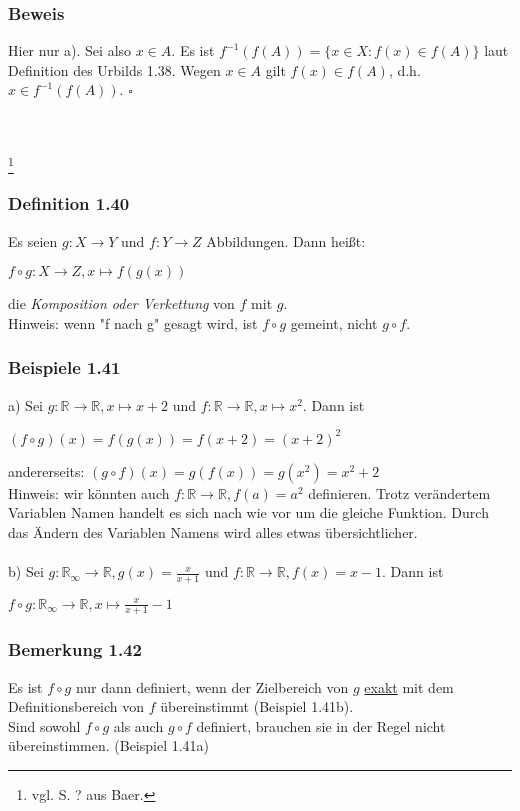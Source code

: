 \documentclass{article}
\begin{document}
\subsubsection*{Beweis}
Hier nur a). Sei also $x \in A$. Es ist $f^{-1}(f(A)) = \{x \in X: f(x) \in f(A)\}$ laut Definition des Urbilds 1.38. 
Wegen $x \in A$ gilt $f(x) \in f(A)$, d.h. $x \in f^{-1}(f(A))$. $\square$
\\
\\
\\
\date{Mittwoch, 01.11.23} \footnote{vgl. S. ? aus Baer.}

\subsubsection*{Definition 1.40}
Es seien $g: X \rightarrow Y$ und $f: Y \rightarrow Z$ Abbildungen. Dann heißt:
\begin{center}
    $f \circ g: X \rightarrow Z, x \mapsto f(g(x))$
\end{center}
die \textit{Komposition oder Verkettung} von $f$ mit $g$. \\
Hinweis: wenn "f nach g" gesagt wird, ist $f \circ g$ gemeint, nicht $g \circ f$.

\subsubsection*{Beispiele 1.41}
a) Sei $g: \mathbb{R} \rightarrow \mathbb{R}, x \mapsto x+2$ und $f: \mathbb{R} \rightarrow \mathbb{R}, x \mapsto x^2$. Dann ist 
\begin{center}
    $(f \circ g)(x) = f(g(x)) = f(x+2) = (x+2)^2$
\end{center}
andererseits: $(g \circ f)(x) = g(f(x)) = g(x^2) = x^2 + 2$ \\
Hinweis: wir könnten auch $f: \mathbb{R} \rightarrow \mathbb{R}, f(a) = a^2$ definieren. Trotz verändertem Variablen Namen handelt es sich nach wie vor um die gleiche Funktion. Durch das Ändern des Variablen Namens wird alles etwas übersichtlicher. \\
\\
b) Sei $g: \mathbb{R_\infty} \rightarrow \mathbb{R}, g(x) = \frac{x}{x+1}$ und $f: \mathbb{R} \rightarrow \mathbb{R}, f(x) = x - 1$. Dann ist
\begin{center}
    $f \circ g: \mathbb{R_\infty} \rightarrow \mathbb{R}, x \mapsto \frac{x}{x+1} - 1$
\end{center}

\subsubsection*{Bemerkung 1.42}
Es ist $f \circ g$ nur dann definiert, wenn der Zielbereich von $g$ \underline{exakt} mit dem Definitionsbereich von $f$ übereinstimmt (Beispiel 1.41b). \\
Sind sowohl $f \circ g$ als auch $g \circ f$ definiert, brauchen sie in der Regel nicht übereinstimmen. (Beispiel 1.41a)\\
\end{document}
